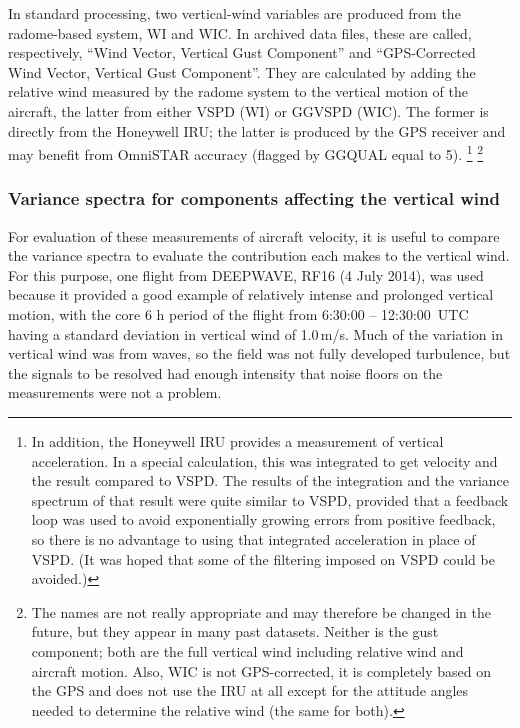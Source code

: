 \documentclass[12pt,twoside,english]{article}\usepackage[]{graphicx}\usepackage[]{color}
\let\OrgIndex\index
\renewcommand*{\index}[1]{\OrgIndex{#1}}
\begin{document}
In standard processing, two vertical-wind variables are produced from
the radome-based system, WI
and WIC.
In archived data files, these are called, respectively, ``Wind Vector, Vertical Gust Component''
and ``GPS-Corrected Wind Vector, Vertical Gust Component''. They
are calculated by adding the relative wind measured by the radome
system to the vertical motion of the aircraft, the latter from either VSPD (WI) or
GGVSPD (WIC). The former is directly from the Honeywell IRU; the latter
is produced by the GPS receiver and may benefit from OmniSTAR accuracy
(flagged by GGQUAL equal to 5).%
\footnote{In addition, the Honeywell IRU provides a measurement of vertical acceleration. In a special calculation, this was integrated to get velocity and the result compared to VSPD. The results of the integration and the variance spectrum of that result were quite similar to VSPD, provided that a feedback loop was used to avoid exponentially growing errors from positive feedback, so there is no advantage to using that integrated acceleration in place of VSPD. (It was hoped that some of the filtering imposed on VSPD could be avoided.)}%
\footnote{The names are not really appropriate and may therefore be changed in the future, but they
appear in many past datasets. Neither is the gust component; both
are the full vertical wind including relative wind and aircraft motion.
Also, WIC is not GPS-corrected, it is completely based on the GPS
and does not use the IRU at all except for the attitude angles needed
to determine the relative wind (the same for both).}



\subsubsection{Variance spectra for components affecting the vertical wind\label{sub:Variance-spectra-for-W-components}}

For evaluation of these measurements of aircraft velocity, it is useful to compare the variance spectra to evaluate the contribution each makes to the vertical wind. For this purpose, one flight from DEEPWAVE, RF16 (4 July 2014), was used because it provided a good example of relatively intense and prolonged vertical motion, with the core 6 h period of the flight from 6:30:00 -- 12:30:00~UTC having a standard deviation in vertical wind of 1.0\,m/s. Much of the variation in vertical wind was from waves, so the field was not fully developed turbulence, but the signals to be resolved had enough intensity that noise floors on the measurements were not a problem. 
\end{document}
